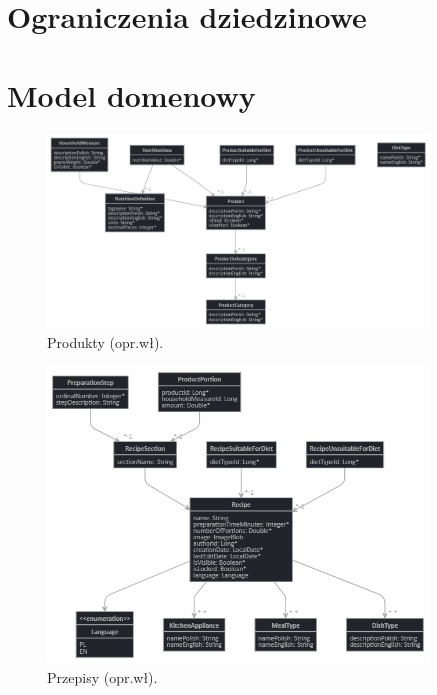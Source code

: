 \section{Ograniczenia dziedzinowe}

\section{Model domenowy}


\begin{minipage}{\textwidth}
    \begin{figure}[H]
        \centering\includegraphics[width=0.9\textwidth]{img/class-diagrams/produkty.png}
        \caption{Produkty (opr.wł).}\label{rysunek:produkty}
    \end{figure}
\end{minipage}

\begin{minipage}{\textwidth}
    \begin{figure}[H]
        \centering\includegraphics[width=0.9\textwidth]{img/class-diagrams/przepisy.png}
        \caption{Przepisy (opr.wł).}\label{rysunek:przepisy}
    \end{figure}
\end{minipage}

